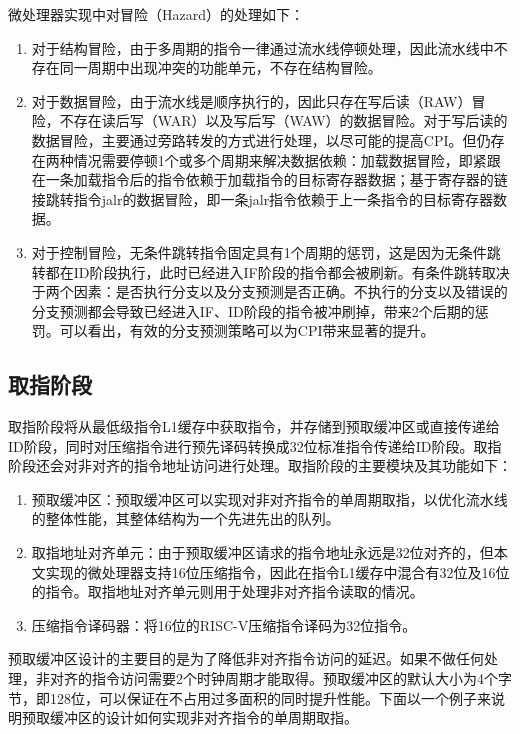 微处理器实现中对冒险（Hazard）的处理如下：

\begin{enumerate}
	\item 对于结构冒险，由于多周期的指令一律通过流水线停顿处理，因此流水线中不存在同一周期中出现冲突的功能单元，不存在结构冒险。
	\item 对于数据冒险，由于流水线是顺序执行的，因此只存在写后读（RAW）冒险，不存在读后写（WAR）以及写后写（WAW）的数据冒险。对于写后读的数据冒险，主要通过旁路转发的方式进行处理，以尽可能的提高CPI。但仍存在两种情况需要停顿1个或多个周期来解决数据依赖：加载数据冒险，即紧跟在一条加载指令后的指令依赖于加载指令的目标寄存器数据；基于寄存器的链接跳转指令jalr的数据冒险，即一条jalr指令依赖于上一条指令的目标寄存器数据。
	\item 对于控制冒险，无条件跳转指令固定具有1个周期的惩罚，这是因为无条件跳转都在ID阶段执行，此时已经进入IF阶段的指令都会被刷新。有条件跳转取决于两个因素：是否执行分支以及分支预测是否正确。不执行的分支以及错误的分支预测都会导致已经进入IF、ID阶段的指令被冲刷掉，带来2个后期的惩罚。可以看出，有效的分支预测策略可以为CPI带来显著的提升。
\end{enumerate}

\subsection{取指阶段}

取指阶段将从最低级指令L1缓存中获取指令，并存储到预取缓冲区或直接传递给ID阶段，同时对压缩指令进行预先译码转换成32位标准指令传递给ID阶段。取指阶段还会对非对齐的指令地址访问进行处理。取指阶段的主要模块及其功能如下：

\begin{enumerate}
	\item 预取缓冲区：预取缓冲区可以实现对非对齐指令的单周期取指，以优化流水线的整体性能，其整体结构为一个先进先出的队列。
	\item 取指地址对齐单元：由于预取缓冲区请求的指令地址永远是32位对齐的，但本文实现的微处理器支持16位压缩指令，因此在指令L1缓存中混合有32位及16位的指令。取指地址对齐单元则用于处理非对齐指令读取的情况。
	\item 压缩指令译码器：将16位的RISC-V压缩指令译码为32位指令。
\end{enumerate}

预取缓冲区设计的主要目的是为了降低非对齐指令访问的延迟。如果不做任何处理，非对齐的指令访问需要2个时钟周期才能取得。预取缓冲区的默认大小为4个字节，即128位，可以保证在不占用过多面积的同时提升性能。下面以一个例子来说明预取缓冲区的设计如何实现非对齐指令的单周期取指。

